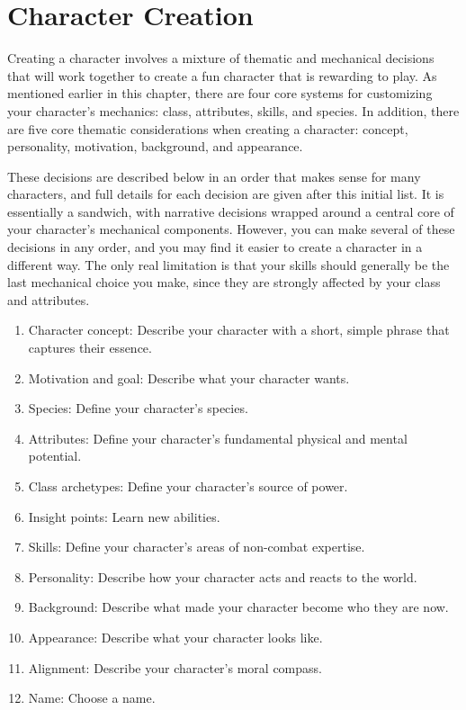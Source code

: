 \section{Character Creation}\label{Character Creation}

  Creating a character involves a mixture of thematic and mechanical decisions that will work together to create a fun character that is rewarding to play.
  As mentioned earlier in this chapter, there are four core systems for customizing your character's mechanics: class, attributes, skills, and species.
  In addition, there are five core thematic considerations when creating a character: concept, personality, motivation, background, and appearance.

  These decisions are described below in an order that makes sense for many characters, and full details for each decision are given after this initial list.
  It is essentially a sandwich, with narrative decisions wrapped around a central core of your character's mechanical components.
  However, you can make several of these decisions in any order, and you may find it easier to create a character in a different way.
  The only real limitation is that your skills should generally be the last mechanical choice you make, since they are strongly affected by your class and attributes.

  \begin{enumerate}
    \item Character concept: Describe your character with a short, simple phrase that captures their essence.
    \item Motivation and goal: Describe what your character wants.

    \item Species: Define your character's species.
    \item Attributes: Define your character's fundamental physical and mental potential.
    \item Class archetypes: Define your character's source of power.
    \item Insight points: Learn new abilities.
    \item Skills: Define your character's areas of non-combat expertise.

    \item Personality: Describe how your character acts and reacts to the world.
    \item Background: Describe what made your character become who they are now.
    \item Appearance: Describe what your character looks like.
    \item Alignment: Describe your character's moral compass.
    \item Name: Choose a name.
  \end{enumerate}

